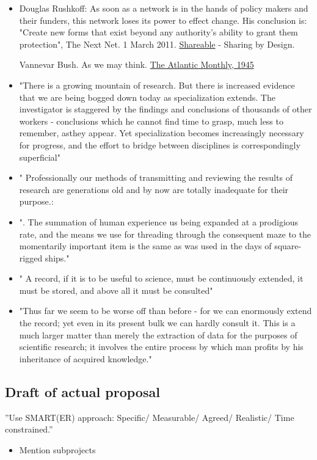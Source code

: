 \documentclass[final,authoryear,3p]{elsarticle-open-drafting}
\begin{document}
\begin{itemize}
	\item  Douglas Rushkoff: As soon as a network is in the hands of policy makers and their funders, this network loses its power to effect change. His conclusion is: "Create new forms that exist beyond any authority's ability to grant them protection", The Next Net. 1 March 2011. \href{http://shareable.net/blog/the-next-net}{Shareable} - Sharing by Design. 

Vannevar Bush. As we may think. \href{http://web.mit.edu/STS.035/www/PDFs/think.pdf}{The Atlantic Monthly, 1945}
	\item "There is a growing mountain of research. But there is increased evidence that we are being bogged down today as specialization extends. The investigator is staggered by the findings and conclusions of thousands of other workers - conclusions which he cannot find time to grasp, much less to remember, asthey appear. Yet specialization becomes increasingly necessary for progress, and the effort to bridge between disciplines is correspondingly superficial"
	\item "
Professionally our methods of transmitting and reviewing the results of research are generations old and
by now are totally inadequate for their purpose.:

	\item ". The summation of human experience us being expanded at a prodigious rate, and
the means we use for threading through the consequent maze to the momentarily important item is the
same as was used in the days of square-rigged ships."
	\item "
A record, if it is to be useful to science, must be continuously extended, it must be stored, and above all it
must be consulted"
	\item "Thus far we seem to be worse
off than before - for we can enormously extend the record; yet even in its present bulk we can hardly
consult it. This is a much larger matter than merely the extraction of data for the purposes of scientific
research; it involves the entire process by which man profits by his inheritance of acquired knowledge."
\end{itemize}

\subsection{Draft of actual proposal}
''Use SMART(ER) approach: Specific/ 
Measurable/ 
Agreed/ 
Realistic/ 
Time constrained.''
\begin{itemize}
	\item Mention subprojects
\end{itemize}
\end{document}

